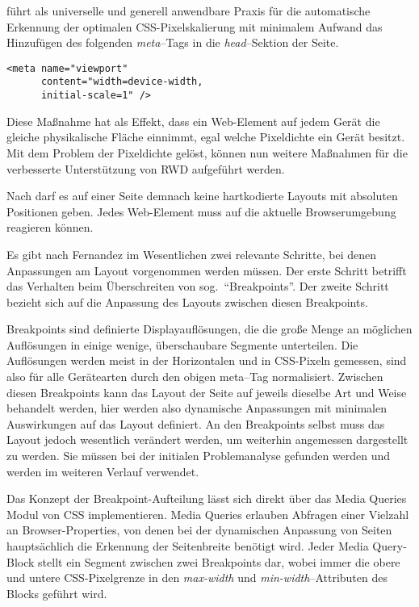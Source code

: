 \autocite{JiangResponsiveWebDesignModeAndApplication.2014} führt als universelle und generell anwendbare Praxis für die automatische Erkennung der optimalen CSS-Pixelskalierung mit minimalem Aufwand das Hinzufügen des folgenden \emph{meta}--Tags in die \emph{head}--Sektion der Seite.

\begin{verbatim}
<meta name="viewport"
      content="width=device-width,
      initial-scale=1" />
\end{verbatim}

Diese Maßnahme hat als Effekt, dass ein Web-Element auf jedem Gerät die gleiche physikalische Fläche einnimmt, egal welche Pixeldichte ein Gerät besitzt.
Mit dem Problem der Pixeldichte gelöst, können nun weitere Maßnahmen für die verbesserte Unterstützung von RWD aufgeführt werden.

Nach \autocite{Katajisto.CreatingSupportContent.2015} darf es auf einer Seite demnach keine hartkodierte Layouts mit absoluten Positionen geben.
Jedes Web-Element muss auf die aktuelle Browserumgebung reagieren können.

Es gibt nach Fernandez \autocite[S. 3]{MobileWebResponsiveWebdesign.Fernandez.2012} im Wesentlichen zwei relevante Schritte, bei denen Anpassungen am Layout vorgenommen werden müssen.
Der erste Schritt betrifft das Verhalten beim Überschreiten von sog.\ "`Breakpoints"'.
Der zweite Schritt bezieht sich auf die Anpassung des Layouts zwischen diesen Breakpoints.

Breakpoints sind definierte Displayauflösungen, die die große Menge an möglichen Auflösungen in einige wenige, überschaubare Segmente unterteilen.
Die Auflösungen werden meist in der Horizontalen und in CSS-Pixeln gemessen, sind also für alle Gerätearten durch den obigen meta--Tag normalisiert.
Zwischen diesen Breakpoints kann das Layout der Seite auf jeweils dieselbe Art und Weise behandelt werden, hier werden also dynamische Anpassungen mit minimalen Auswirkungen auf das Layout definiert.
An den Breakpoints selbst muss das Layout jedoch wesentlich verändert werden, um weiterhin angemessen dargestellt zu werden.
Sie müssen bei der initialen Problemanalyse gefunden werden und werden im weiteren Verlauf verwendet.

Das Konzept der Breakpoint-Aufteilung lässt sich direkt über das Media Queries Modul von CSS implementieren.
\autocite{JiangResponsiveWebDesignModeAndApplication.2014}
Media Queries erlauben Abfragen einer Vielzahl an Browser-Properties, von denen bei der dynamischen Anpassung von Seiten hauptsächlich die Erkennung der Seitenbreite benötigt wird.
Jeder Media Query-Block stellt ein Segment zwischen zwei Breakpoints dar, wobei immer die obere und untere CSS-Pixelgrenze in den \emph{max-width} und \emph{min-width}--Attributen des Blocks geführt wird.

